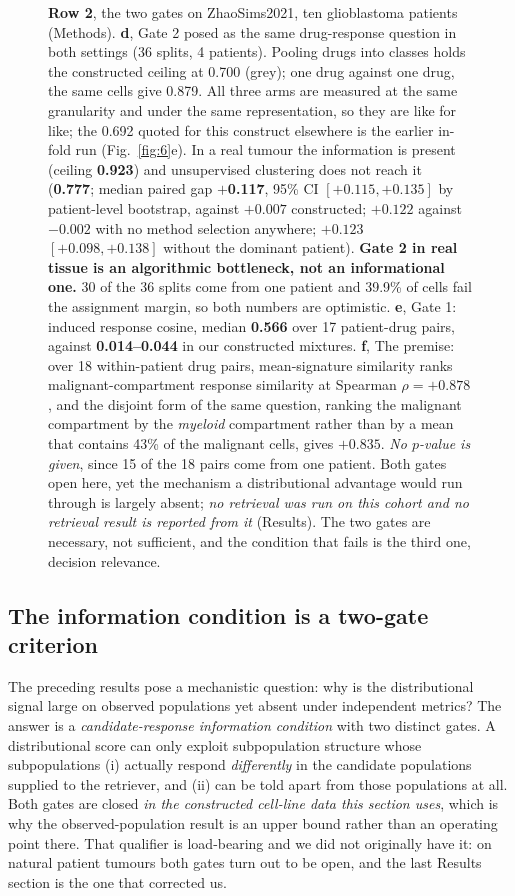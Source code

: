\documentclass[11pt,letterpaper]{article}
\newcommand{\PREMISEOVERLAP}{+0.878}
\newcommand{\PREMISEDISJOINT}{+0.835}
\begin{document}
\begin{figure}[!htbp]
{\textbf{Row 2}, the two gates on ZhaoSims2021, ten glioblastoma patients (Methods). \textbf{d}, Gate 2 posed as the same drug-response question in both settings (36 splits, 4 patients). Pooling drugs into classes holds the constructed ceiling at 0.700 (grey); one drug against one drug, the same cells give 0.879. All three arms are measured at the same granularity and under the same representation, so they are like for like; the 0.692 quoted for this construct elsewhere is the earlier in-fold run (Fig.~\ref{fig:6}e). In a real tumour the information is present (ceiling \textbf{0.923}) and unsupervised clustering does not reach it (\textbf{0.777}; median paired gap \textbf{$+$0.117}, 95\% CI $[+0.115, +0.135]$ by patient-level bootstrap, against $+0.007$ constructed; $+0.122$ against $-0.002$ with no method selection anywhere; $+0.123$ $[+0.098, +0.138]$ without the dominant patient). \textbf{Gate 2 in real tissue is an algorithmic bottleneck, not an informational one.} 30 of the 36 splits come from one patient and 39.9\% of cells fail the assignment margin, so both numbers are optimistic. \textbf{e}, Gate 1: induced response cosine, median \textbf{0.566} over 17 patient-drug pairs, against \textbf{0.014--0.044} in our constructed mixtures. \textbf{f}, The premise: over 18 within-patient drug pairs, mean-signature similarity ranks malignant-compartment response similarity at Spearman $\rho = \mathbf{\PREMISEOVERLAP}$, and the disjoint form of the same question, ranking the malignant compartment by the \emph{myeloid} compartment rather than by a mean that contains 43\% of the malignant cells, gives $\mathbf{\PREMISEDISJOINT}$. \emph{No $p$-value is given}, since 15 of the 18 pairs come from one patient. Both gates open here, yet the mechanism a distributional advantage would run through is largely absent; \emph{no retrieval was run on this cohort and no retrieval result is reported from it} (Results). The two gates are necessary, not sufficient, and the condition that fails is the third one, decision relevance.}
\label{fig:5}
\end{figure}

\subsection*{The information condition is a two-gate criterion}

The preceding results pose a mechanistic question: why is the distributional signal large
on observed populations yet absent under independent metrics? The answer is a
\textit{candidate-response information condition} with two distinct gates. A
distributional score can only exploit subpopulation structure whose subpopulations (i) actually
respond \emph{differently} in the candidate populations supplied to the retriever, and (ii) can
be told apart from those populations at all. Both gates are closed \emph{in the constructed
cell-line data this section uses}, which is why the observed-population result is an upper bound
rather than an operating point there. That qualifier is load-bearing and we did not originally
have it: on natural patient tumours both gates turn out to be open, and the last Results section
is the one that corrected us.
\end{document}
